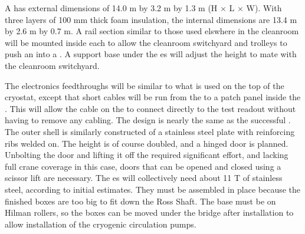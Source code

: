 A \coldbox has external dimensions of 14.0 \si{m} by 3.2 \si{m} by 1.3 \si{m} (H $\times$ L $\times$ W). With three layers of 100 \si{mm} thick foam insulation,  
the internal dimensions are 13.4 \si{m} by 2.6 \si{m} by 0.7 \si{m}. A rail section similar to those used elswhere in the cleanroom will be mounted inside each \coldbox to allow the cleanroom switchyard and trolleys to push an    into a \coldbox. A support base under the \coldbox{}es will adjust the height to mate with the cleanroom switchyard.

 
The \coldbox electronics feedthroughs will be  similar to what is used on the top of the  cryostat, except that short cables will be run from the   to a patch panel inside the \coldbox. This will allow the cable on the  to connect directly to the test readout without having to remove any cabling. The \coldbox  design is nearly the same as the successful  \coldbox. The outer shell is similarly constructed of a stainless steel plate with reinforcing ribs welded on. The height is of course doubled, and a hinged door is planned. Unbolting the door and lifting it off the  \coldbox required significant effort, and lacking full crane coverage in this case, doors that can be opened and closed using a scissor lift are necessary. The  \coldbox{}es will collectively need about 11 \si{T} of stainless steel, according to initial estimates. They must be assembled in place because the finished boxes are too big to fit down the Ross Shaft. The \coldbox base must be on Hilman rollers, so the boxes can be moved under the bridge after  installation  to allow installation of the cryogenic circulation pumps.




